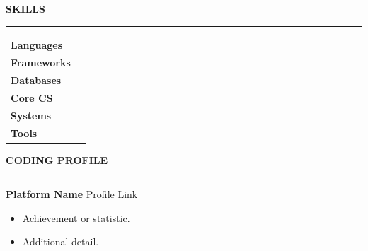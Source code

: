 \documentclass[10pt,a4paper]{article}
\newcommand{\sectionheading}[1]{%
    \vspace{6pt}
    {\large\textbf{#1}}
    \vspace{4pt}
    \hrule
    \vspace{4pt}
}
\begin{document}
\vspace{4pt}


\sectionheading{SKILLS}

\begin{tabular}{@{}p{3cm}p{13cm}@{}}
\textbf{Languages} &  \\
\textbf{Frameworks} &  \\
\textbf{Databases} &  \\
\textbf{Core CS} &  \\
\textbf{Systems} &  \\
\textbf{Tools} &  \\
\end{tabular}

\vspace{4pt}


\sectionheading{CODING PROFILE}

\textbf{Platform Name} \hfill
\href{https://platform.com/profile}{Profile Link}

\begin{itemize}[leftmargin=12pt,itemsep=2pt,topsep=2pt]
    \item Achievement or statistic.
    \item Additional detail.
\end{itemize}
\end{document}
